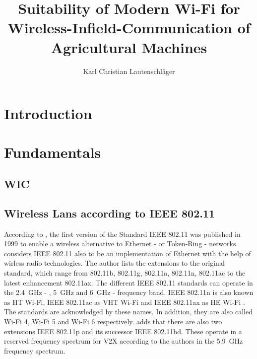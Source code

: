 \documentclass[]{nsm-thesis}
\author{Karl Christian Lautenschläger}
\title{Suitability of Modern Wi-Fi for Wireless-Infield-Communication of Agricultural Machines}
\begin{document}

\maketitle

\cleardoublepage





\tableofcontents

\cleardoublepage
{}


\chapter{Introduction}
\label{sec:introduction}


\chapter{Fundamentals}
\label{sec:fundamentals}


\section{\acl{WIC}}





\section{Wireless Lans according to IEEE 802.11}


According to \textcite{kauffels_wireless_2002}, the first version of the Standard IEEE 802.11 was published in 1999 to enable a wireless alternative to Ethernet - or Token-Ring - networks.
\textcite{sauter_wireless_2022} considers IEEE 802.11 also to be an implementation of Ethernet with the help of wirless radio technologies.
The author lists the extensions to the original standard, which range from 802.11b, 802.11g, 802.11a, 802.11n, 802.11ac to the latest enhancement 802.11ax. The different IEEE 802.11 standards can operate in the  \SI{2.4}{\giga\hertz} - , \SI{5}{\giga\hertz} and \SI{6}{\giga\hertz} - frequency band.
IEEE 802.11n is also known as \ac{HT} Wi-Fi, IEEE 802.11ac as \ac{VHT} Wi-Fi \cite{noauthor_ieee_2021-1} and IEEE 802.11ax as \ac{HE} Wi-Fi \cite{noauthor_ieee_2021}.
The standards are acknowledged by these names.
In addition, they are also called Wi-Fi 4, Wi-Fi 5 and Wi-Fi 6 respectively.
\textcite{jacob_system-level_2020} adds that there are also two extensions IEEE 802.11p and its successor IEEE 802.11bd. These operate in a reserved frequency spectrum for \ac{V2X} according to the authors in the \SI{5.9}{\giga\hertz} frequency spectrum.
\end{document}
